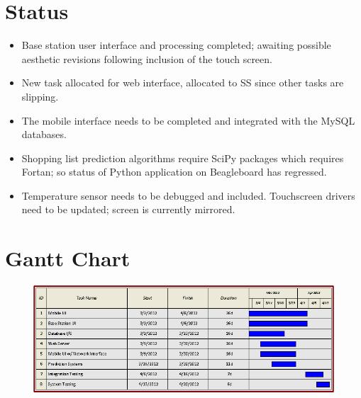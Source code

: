 \documentclass[11pt,letterpaper]{article}
\begin{document}
\section{Status}
\begin{itemize}
\item Base station user interface and processing completed; awaiting possible aesthetic revisions following inclusion of the touch screen.
\item New task allocated for web interface, allocated to SS since other tasks are slipping.
\item The mobile interface needs to be completed and integrated with the MySQL databases.
\item Shopping list prediction algorithms require SciPy packages which requires Fortan; so status of Python application on Beagleboard has regressed.
\item Temperature sensor needs to be debugged and included. Touchscreen drivers need to be updated; screen is currently mirrored.
\end{itemize}
\pagebreak
\section{Gantt Chart}
\begin{figure}[h!]
\begin{center}
\includegraphics[scale=.6]{GanttChartI}
\end{center}
\end{figure}
\end{document}
